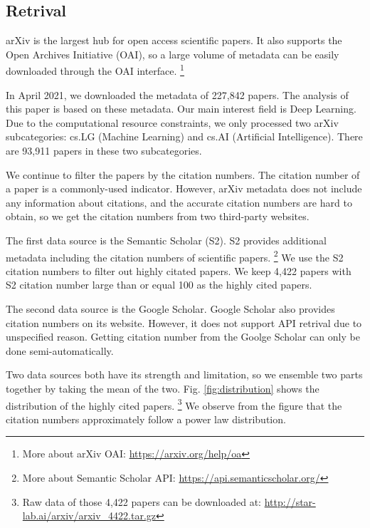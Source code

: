 \subsection{Retrival}

arXiv is the largest hub for open access scientific papers.
It also supports the Open Archives Initiative (OAI), 
so a large volume of metadata can be easily downloaded through the OAI interface.
\footnote{More about arXiv OAI: \url{https://arxiv.org/help/oa}}

In April 2021, we downloaded the metadata of 227,842 papers.
The analysis of this paper is based on these metadata.
Our main interest field is Deep Learning.
Due to the computational resource constraints, we only processed two arXiv subcategories: cs.LG (Machine Learning) and cs.AI (Artificial Intelligence).
There are 93,911 papers in these two subcategories.

We continue to filter the papers by the citation numbers.
The citation number of a paper is a commonly-used indicator.
However, arXiv metadata does not include any information about citations,
and the accurate citation numbers are hard to obtain, 
so we get the citation numbers from two third-party websites.

The first data source is the Semantic Scholar (S2).
S2 provides additional metadata including the citation numbers of scientific papers.
\footnote{More about Semantic Scholar API: \url{https://api.semanticscholar.org/}}
We use the S2 citation numbers to filter out highly citated papers.
We keep 4,422 papers with S2 citation number large than or equal 100 as the highly cited papers.

The second data source is the Google Scholar.
Google Scholar also provides citation numbers on its website.
However, it does not support API retrival due to unspecified reason.
Getting citation number from the Goolge Scholar can only be done semi-automatically.

Two data sources both have its strength and limitation,
so we ensemble two parts together by taking the mean of the two.
Fig. \ref{fig:distribution} shows the distribution of the highly cited papers.
\footnote{Raw data of those 4,422 papers can be downloaded at: \url{http://star-lab.ai/arxiv/arxiv_4422.tar.gz}}
We observe from the figure that the citation numbers approximately follow a power law distribution.

